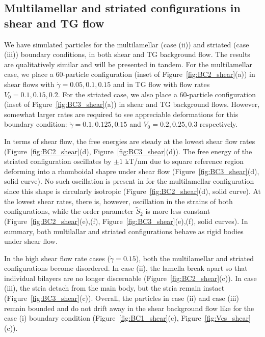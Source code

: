 \documentclass[prb,preprint,showpacs,preprintnumbers,amsmath,amssymb,longbibliography]{revtex4-1}
\begin{document}
\subsection{Multilamellar and striated configurations in shear and TG flow}
We have simulated particles for the multilamellar (case (ii)) and striated (case (iii))
boundary conditions, in both shear and TG background flow.  The results are
qualitatively similar and will be presented in tandem. 
For the multilamellar case, we place a 60-particle configuration (inset of Figure~\ref{fig:BC2_shear}(a))
in shear flows with $\dot\gamma=0.05, 0.1, 0.15$ and in TG flow with flow rates $V_0=0.1, 0.15, 0.2$.
For the striated case, we also place a 60-particle configuration (inset of Figure~\ref{fig:BC3_shear}(a))
in shear and TG background flows.  However, somewhat larger rates are required to see appreciable
deformations for this boundary condition: $\dot\gamma=0.1, 0.125, 0.15$
and $V_0=0.2, 0.25, 0.3$ respectively.  

In terms of shear flow, the free energies are steady at the lowest shear flow
rates (Figure~\ref{fig:BC2_shear}(d), Figure~\ref{fig:BC3_shear}(d)).
The free energy of the striated configuration oscillates by $\pm 1$ kT/nm
due to square reference region deforming into a rhomboidal shapre under shear
flow (Figure~\ref{fig:BC3_shear}(d), solid curve).  No such oscillation
is present in for the multilamellar configuration since this shape is circularly
isotropic (Figure~\ref{fig:BC2_shear}(d), solid curve).
At the lowest shear rates, there is, however, oscillation in the strains
of both configurations, 
while the order parameter $\tilde S_2$ is more less constant
(Figure~\ref{fig:BC2_shear}(e),(f), Figure~\ref{fig:BC3_shear}(e),(f), solid curves).
In summary, both multilallar and striated configurations behave as rigid bodies
under shear flow.

In the high shear flow rate cases ($\dot\gamma=0.15$), both the
multilamellar and striated configurations become disordered.  In case (ii),
the lamella break apart so that individual bilayers are no longer discernable
(Figure~\ref{fig:BC2_shear}(c)).
In case (iii), the stria detach from the main body,
but the stria remain instact (Figure~\ref{fig:BC3_shear}(c)).  
Overall, the particles in case (ii) and case (iii) remain bounded
and do not drift away in the shear background flow like for the
case (i) boundary condition (Figure~\ref{fig:BC1_shear}(c),
Figure~\ref{fig:Ves_shear}(c)).
\end{document}

